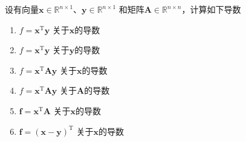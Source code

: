 \begin{example}
    设有向量\( \bm{x} \in \mathbb{R}^{n \times 1} \)、\( \bm{y} \in \mathbb{R}^{n \times 1} \) 和矩阵\( \mathbf{A} \in \mathbb{R}^{n \times n} \)，计算如下导数
    \begin{enumerate}
        \item \( f = \bm{x}^{\mathrm{T}} \bm{y} \) 关于\( \bm{x} \)的导数
        \item \( f = \bm{x}^{\mathrm{T}} \bm{y} \) 关于\( \bm{y} \)的导数
        \item \( f = \bm{x}^{\mathrm{T}} \mathbf{A} \bm{y} \) 关于\( \bm{x} \)的导数
        \item \( f = \bm{x}^{\mathrm{T}} \mathbf{A} \bm{y} \) 关于\( \mathbf{A} \)的导数
        \item \( \bm{f} = \bm{x}^{\mathrm{T}} \mathbf{A} \) 关于\( \bm{x} \)的导数
        \item \( \bm{f} = (\bm{x} - \bm{y})^{\mathrm{T}} \) 关于\( \bm{x} \)的导数
    \end{enumerate}
\end{example}
